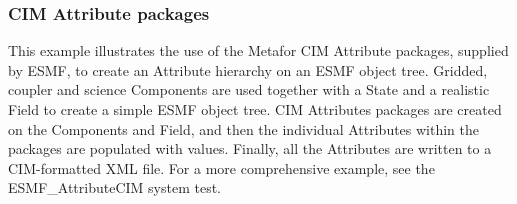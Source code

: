  
\setlength{\oldparskip}{\parskip}
\setlength{\parskip}{1.5ex}
\setlength{\oldparindent}{\parindent}
\setlength{\parindent}{0pt}
\setlength{\oldbaselineskip}{\baselineskip}
\setlength{\baselineskip}{11pt}
 
\def\bv{\begin{verbatim}}
\def\ev{\end{verbatim}}
\def\be{\begin{equation}}
\def\ee{\end{equation}}
\def\bea{\begin{eqnarray}}
\def\eea{\end{eqnarray}}
\def\bi{\begin{itemize}}
\def\ei{\end{itemize}}
\def\bn{\begin{enumerate}}
\def\en{\end{enumerate}}
\def\bd{\begin{description}}
\def\ed{\end{description}}
\def\({\left (}
\def\){\right )}
\def\[{\left [}
\def\]{\right ]}
\def\<{\left  \langle}
\def\>{\right \rangle}
\def\cI{{\cal I}}
\def\diag{\mathop{\rm diag}}
\def\tr{\mathop{\rm tr}}


 

   \subsubsection{CIM Attribute packages}
   \label{sec:attribute:usage:cimAttPack}
  
  \begin{sloppypar}
   This example illustrates the use of the Metafor CIM Attribute packages,
   supplied by ESMF, to create an Attribute hierarchy on an ESMF object tree.
   Gridded, coupler and science Components are used together with a State
   and a realistic Field
   to create a simple ESMF object tree.  CIM Attributes packages are created
   on the Components and Field, and then the individual Attributes within the
   packages are populated with values.  Finally, all the Attributes are written
   to a CIM-formatted XML file.  For a more comprehensive example, see the
   ESMF\_AttributeCIM system test.
  \end{sloppypar} 

